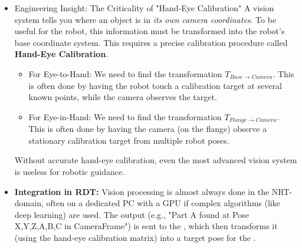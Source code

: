 \begin{itemize}
\begin{itemize}
            \end{itemize}
        \item\begin{tipbox}{Engineering Insight: The Criticality of "Hand-Eye Calibration"} %
A vision system tells you where an object is in \textit{its own camera coordinates}. To be useful for the robot, this information must be transformed into the robot's base coordinate system. This requires a precise calibration procedure called \textbf{Hand-Eye Calibration}.
\begin{itemize}
    \item For Eye-to-Hand: We need to find the transformation \(T_{Base \to Camera}\). This is often done by having the robot touch a calibration target at several known points, while the camera observes the target.
    \item For Eye-in-Hand: We need to find the transformation \(T_{Flange \to Camera}\). This is often done by having the camera (on the flange) observe a stationary calibration target from multiple robot poses.
\end{itemize}
Without accurate hand-eye calibration, even the most advanced vision system is useless for robotic guidance.
\end{tipbox}
        \item \textbf{Integration in RDT:} Vision processing is almost always done in the NRT-domain, often on a dedicated PC with a GPU if complex algorithms (like deep learning) are used. The output (e.g., "Part A found at Pose X,Y,Z,A,B,C in CameraFrame") is sent to the , which then transforms it (using the hand-eye calibration matrix) into a target pose for the .
    \end{itemize}


